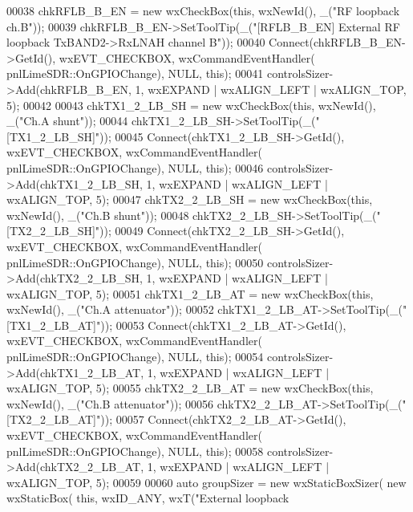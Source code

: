 \begin{DoxyCode}
00038     chkRFLB\_B\_EN = \textcolor{keyword}{new} wxCheckBox(\textcolor{keyword}{this}, wxNewId(), \_(\textcolor{stringliteral}{"RF loopback ch.B"}));
00039     chkRFLB\_B\_EN->SetToolTip(\_(\textcolor{stringliteral}{"[RFLB\_B\_EN] External RF loopback TxBAND2->RxLNAH channel B"}));
00040     Connect(chkRFLB\_B\_EN->GetId(), wxEVT\_CHECKBOX, wxCommandEventHandler(
      pnlLimeSDR::OnGPIOChange), NULL, \textcolor{keyword}{this});
00041     controlsSizer->Add(chkRFLB\_B\_EN, 1, wxEXPAND | wxALIGN\_LEFT | wxALIGN\_TOP, 5);
00042 
00043     chkTX1\_2\_LB\_SH = \textcolor{keyword}{new} wxCheckBox(\textcolor{keyword}{this}, wxNewId(), \_(\textcolor{stringliteral}{"Ch.A shunt"}));
00044     chkTX1\_2\_LB\_SH->SetToolTip(\_(\textcolor{stringliteral}{"[TX1\_2\_LB\_SH]"}));
00045     Connect(chkTX1\_2\_LB\_SH->GetId(), wxEVT\_CHECKBOX, wxCommandEventHandler(
      pnlLimeSDR::OnGPIOChange), NULL, \textcolor{keyword}{this});
00046     controlsSizer->Add(chkTX1\_2\_LB\_SH, 1, wxEXPAND | wxALIGN\_LEFT | wxALIGN\_TOP, 5);
00047     chkTX2\_2\_LB\_SH = \textcolor{keyword}{new} wxCheckBox(\textcolor{keyword}{this}, wxNewId(), \_(\textcolor{stringliteral}{"Ch.B shunt"}));
00048     chkTX2\_2\_LB\_SH->SetToolTip(\_(\textcolor{stringliteral}{"[TX2\_2\_LB\_SH]"}));
00049     Connect(chkTX2\_2\_LB\_SH->GetId(), wxEVT\_CHECKBOX, wxCommandEventHandler(
      pnlLimeSDR::OnGPIOChange), NULL, \textcolor{keyword}{this});
00050     controlsSizer->Add(chkTX2\_2\_LB\_SH, 1, wxEXPAND | wxALIGN\_LEFT | wxALIGN\_TOP, 5);
00051     chkTX1\_2\_LB\_AT = \textcolor{keyword}{new} wxCheckBox(\textcolor{keyword}{this}, wxNewId(), \_(\textcolor{stringliteral}{"Ch.A attenuator"}));
00052     chkTX1\_2\_LB\_AT->SetToolTip(\_(\textcolor{stringliteral}{"[TX1\_2\_LB\_AT]"}));
00053     Connect(chkTX1\_2\_LB\_AT->GetId(), wxEVT\_CHECKBOX, wxCommandEventHandler(
      pnlLimeSDR::OnGPIOChange), NULL, \textcolor{keyword}{this});
00054     controlsSizer->Add(chkTX1\_2\_LB\_AT, 1, wxEXPAND | wxALIGN\_LEFT | wxALIGN\_TOP, 5);
00055     chkTX2\_2\_LB\_AT = \textcolor{keyword}{new} wxCheckBox(\textcolor{keyword}{this}, wxNewId(), \_(\textcolor{stringliteral}{"Ch.B attenuator"}));
00056     chkTX2\_2\_LB\_AT->SetToolTip(\_(\textcolor{stringliteral}{"[TX2\_2\_LB\_AT]"}));
00057     Connect(chkTX2\_2\_LB\_AT->GetId(), wxEVT\_CHECKBOX, wxCommandEventHandler(
      pnlLimeSDR::OnGPIOChange), NULL, \textcolor{keyword}{this});
00058     controlsSizer->Add(chkTX2\_2\_LB\_AT, 1, wxEXPAND | wxALIGN\_LEFT | wxALIGN\_TOP, 5);
00059 
00060     \textcolor{keyword}{auto} groupSizer = \textcolor{keyword}{new} wxStaticBoxSizer( \textcolor{keyword}{new} wxStaticBox( \textcolor{keyword}{this}, wxID\_ANY, wxT(\textcolor{stringliteral}{"External loopback
}
\end{DoxyCode}
